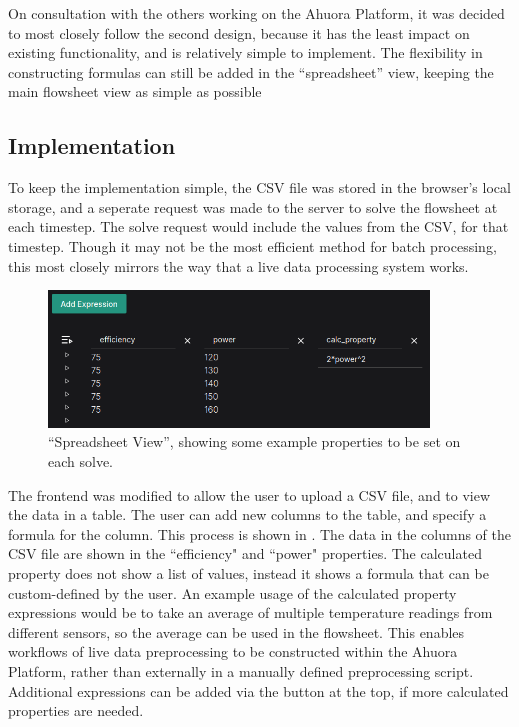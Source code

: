 On consultation with the others working on the Ahuora Platform, it was decided to most closely follow the second design, because it has the least impact on existing functionality, and is relatively simple to implement. The flexibility in constructing formulas can still be added in the ``spreadsheet'' view, keeping the main flowsheet view as simple as possible

\subsection{Implementation}

To keep the implementation simple, the CSV file was stored in the browser's local storage, and a seperate request was made to the server to solve the flowsheet at each timestep. The solve request would include the values from the CSV, for that timestep. Though it may not be the most efficient method for batch processing, this most closely mirrors the way that a live data processing system works. 

\begin{figure}[h]
    \centering
    \includegraphics[width=0.9\textwidth]{mss_sheet.png}
    \caption{``Spreadsheet View'', showing some example properties to be set on each solve.}
    \label{fig:spreadsheetview}
\end{figure}

The frontend was modified to allow the user to upload a CSV file, and to view the data in a table. The user can add new columns to the table, and specify a formula for the column.  This process is shown in . The data in the columns of the CSV file are shown in the ``efficiency" and ``power" properties. The calculated property does not show a list of values, instead it shows a formula that can be custom-defined by the user. An example usage of the calculated property expressions would be to take an average of multiple temperature readings from different sensors, so the average can be used in the flowsheet. This enables workflows of live data preprocessing to be constructed within the Ahuora Platform, rather than externally in a manually defined preprocessing script. Additional expressions can be added via the button at the top, if more calculated properties are needed.

